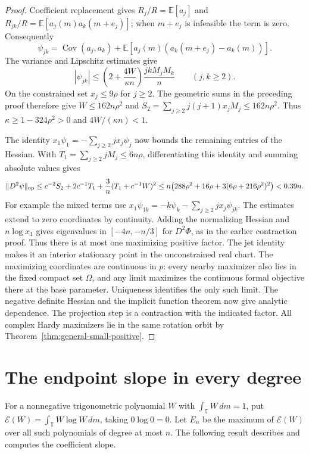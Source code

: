\documentclass[11pt]{article}
\begin{document}
\begin{proof}
Coefficient replacement gives \(R_j/R=\mathbb E[a_j]\) and
\(R_{jk}/R=\mathbb E[a_j(m)a_k(m+e_j)]\); when \(m+e_j\)
is infeasible the term is zero. Consequently
\[
 \psi_{jk}=\operatorname{Cov}(a_j,a_k)
       +\mathbb E\!\left[a_j(m)(a_k(m+e_j)-a_k(m))\right].
\]
The variance and Lipschitz estimates give
\[
 |\psi_{jk}|
 \leq \left(2+\frac{4W}{\kappa n}\right)
          \frac{jk M_j M_k}{n}\qquad(j,k\geq2).
\]
On the constrained set \(x_j\leq9\rho\) for \(j\ge2\).
The geometric sums in the preceding proof therefore give
\(W\leq162n\rho^2\) and
\(S_2=\sum_{j\ge2}j(j+1)x_jM_j\leq162n\rho^2\).
Thus \(\kappa\geq1-324\rho^2>0\) and
\(4W/(\kappa n)<1\).

The identity \(x_1\psi_1=-\sum_{j\ge2}jx_j\psi_j\)
now bounds the remaining entries of the Hessian.
With \(T_1=\sum_{j\ge2}j M_j\leq6n\rho\), differentiating
this identity and summing absolute values gives
\[
 \|D^2\psi\|_{\rm op}
 \leq c^{-2}S_2+2c^{-1}T_1+\frac3n(T_1+c^{-1}W)^2
 \leq n\bigl(288\rho^2+16\rho+3(6\rho+216\rho^2)^2\bigr)
 <0.39n .
\]
For example the mixed terms use
\(x_1\psi_{1k}=-k\psi_k-\sum_{j\ge2}jx_j\psi_{jk}\).
The estimates extend to zero coordinates by continuity.
Adding the normalizing Hessian and \(n\log x_1\) gives
eigenvalues in \([-4n,-n/3]\) for \(D^2\Phi\), as in the
earlier contraction proof.
Thus there is at most one maximizing positive factor.
The jet identity makes it an interior stationary point
in the unconstrained real chart. The maximizing coordinates
are continuous in \(p\): every nearby maximizer also lies in
the fixed compact set \(\Omega\), and any limit maximizes the
continuous formal objective there at the base parameter.
Uniqueness identifies the only such limit. The negative
definite Hessian and the implicit function theorem now give
analytic dependence. The projection step is a contraction
with the indicated factor.
All complex Hardy maximizers lie in the same rotation
orbit by Theorem~\ref{thm:general-small-positive}.
\end{proof}

\section{The endpoint slope in every degree}

For a nonnegative trigonometric polynomial \(W\) with
\(\int_{\mathbb T}W\,dm=1\), put
\(\mathcal E(W)=\int_{\mathbb T}W\log W\,dm\), taking
\(0\log 0=0\). Let \(E_n\) be the maximum of \(\mathcal E(W)\)
over all such polynomials of degree at most \(n\). The following
result describes and computes the coefficient slope.
\end{document}
